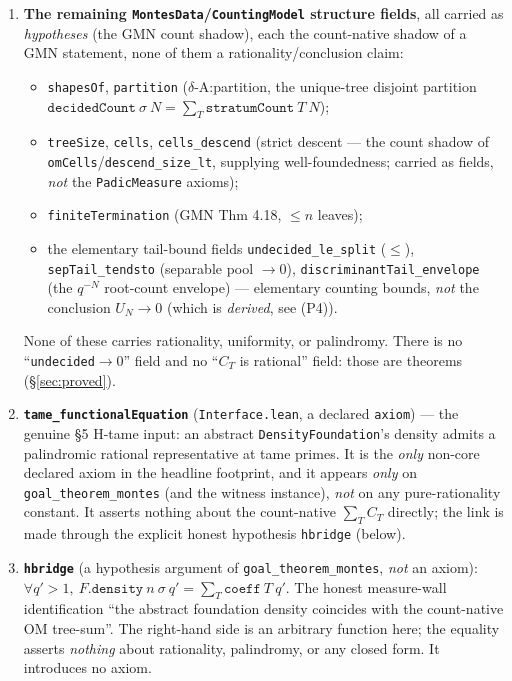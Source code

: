\documentclass[11pt]{article}
\theoremstyle{definition}
\theoremstyle{remark}
\begin{document}
\begin{enumerate}[label=\textup{(A\arabic*)},leftmargin=*]
\item\textbf{The remaining \texttt{MontesData}/\texttt{CountingModel} structure
fields}, all carried as \emph{hypotheses} (the GMN count shadow), each the
count-native shadow of a GMN statement, none of them a rationality/conclusion claim:
\begin{itemize}[nosep]
\item \texttt{shapesOf}, \texttt{partition} ($\delta$-A:partition, the unique-tree
disjoint partition $\texttt{decidedCount}\ \sigma\ N = \sum_T \texttt{stratumCount}\ T\ N$);
\item \texttt{treeSize}, \texttt{cells}, \texttt{cells\_descend} (strict descent
--- the count shadow of \texttt{omCells}/\texttt{descend\_size\_lt}, supplying
well-foundedness; carried as fields, \emph{not} the \texttt{PadicMeasure} axioms);
\item \texttt{finiteTermination} (GMN Thm 4.18, $\le n$ leaves);
\item the elementary tail-bound fields \texttt{undecided\_le\_split} ($\le$),
\texttt{sepTail\_tendsto} (separable pool $\to0$), \texttt{discriminantTail\_envelope}
(the $q^{-N}$ root-count envelope) --- elementary counting bounds, \emph{not} the
conclusion $U_N\to0$ (which is \emph{derived}, see (P4)).
\end{itemize}
None of these carries rationality, uniformity, or palindromy. There is no
``\texttt{undecided}$\to0$'' field and no ``$C_T$ is rational'' field: those are
theorems (\S\ref{sec:proved}).

\item\textbf{\texttt{tame\_functionalEquation}} (\texttt{Interface.lean}, a declared
\texttt{axiom}) --- the genuine \S5 H-tame input: an abstract
\texttt{DensityFoundation}'s density admits a palindromic rational representative at
tame primes. It is the \emph{only} non-core declared axiom in the headline footprint,
and it appears \emph{only} on \texttt{goal\_theorem\_montes} (and the witness
instance), \emph{not} on any pure-rationality constant. It asserts nothing about the
count-native $\sum_T C_T$ directly; the link is made through the explicit honest
hypothesis \texttt{hbridge} (below).

\item\textbf{\texttt{hbridge}} (a hypothesis argument of
\texttt{goal\_theorem\_montes}, \emph{not} an axiom): $\forall q'>1,\
F.\texttt{density}\ n\ \sigma\ q' = \sum_{T}\texttt{coeff}\ T\ q'$. The honest
measure-wall identification ``the abstract foundation density coincides with the
count-native OM tree-sum''. The right-hand side is an arbitrary function here; the
equality asserts \emph{nothing} about rationality, palindromy, or any closed form. It
introduces no axiom.
\end{enumerate}
\end{document}
